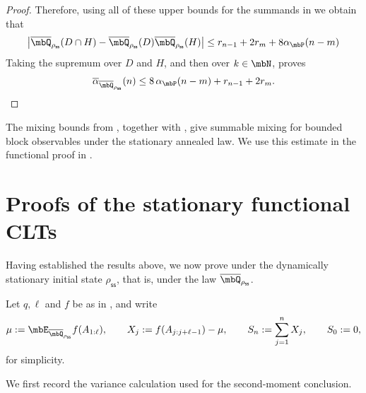 \documentclass[a4paper]{article}
\numberwithin{equation}{section}   %
\theoremstyle{plain}   %
\theoremstyle{plain}   %
\theoremstyle{examplestyle}
\DeclareMathOperator{\pr}{\mbP}           %
\newcommand{\s}{\rho_{\mathsf{ss}}}     %
\begin{document}
\begin{proof}
            Therefore, using all of these upper bounds for the summands in  we obtain that 
            \[
                 \left|
                    \overline\mbQ_{\s}(D\cap H)
                    -
                    \overline\mbQ_{\s}(D)
                    \overline\mbQ_{\s}(H)
                \right|
                \le
                r_{n-1} + 2r_m + 8\alpha_{\pr}(n-m)
            \]
            Taking the supremum over \(D\) and \(H\), and then over \(k\in\mbN\), proves
            \[
                \overline\alpha_{\overline\mbQ_{\s}}(n)
                \le
                8\,\alpha_{\pr}(n-m)
                +
                r_{n-1}
                +
                2r_m.
            \]
        \end{proof}

        
   
    The mixing bounds from , together with , give summable mixing for bounded block observables under the stationary annealed law. We use this estimate in the functional proof in . 


\section{Proofs of the stationary functional CLTs}
\label{section:universal_proof}


Having established the results above, we now prove  under the dynamically stationary initial state $\s$, that is, under the law $\overline\mbQ_{\s}$.

Let $q,\ell$ and $f$ be as in , and write
\[
 \mu:=\mbE_{\overline\mbQ_{\s}}f(A_{1:\ell}),
 \qquad X_j:=f(A_{j:j+\ell-1})-\mu,
 \qquad S_n:=\sum_{j=1}^nX_j,
 \qquad S_0:=0,
\]
for simplicity. 

We first record the variance calculation used for the second-moment conclusion.
\end{document}
